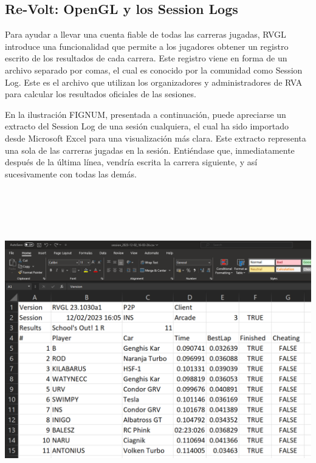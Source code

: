 \subsection{Re-Volt: OpenGL y los Session Logs}

Para ayudar a llevar una cuenta fiable de todas las carreras jugadas, RVGL introduce una funcionalidad que permite a los jugadores obtener un registro escrito de los resultados de cada carrera. Este registro viene en forma de un archivo separado por comas, el cual es conocido por la comunidad como Session Log. Este es el archivo que utilizan los organizadores y administradores de RVA para calcular los resultados oficiales de las sesiones.

En la ilustración FIGNUM, presentada a continuación, puede apreciarse un extracto del Session Log de una sesión cualquiera, el cual ha sido importado desde Microsoft Excel para una visualización más clara. Este extracto representa una sola de las carreras jugadas en la sesión. Entiéndase que, inmediatamente después de la última línea, vendría escrita la carrera siguiente, y así sucesivamente con todas las demás.

\includegraphics[width=16cm, height=14cm]{img/raw-results.png}

